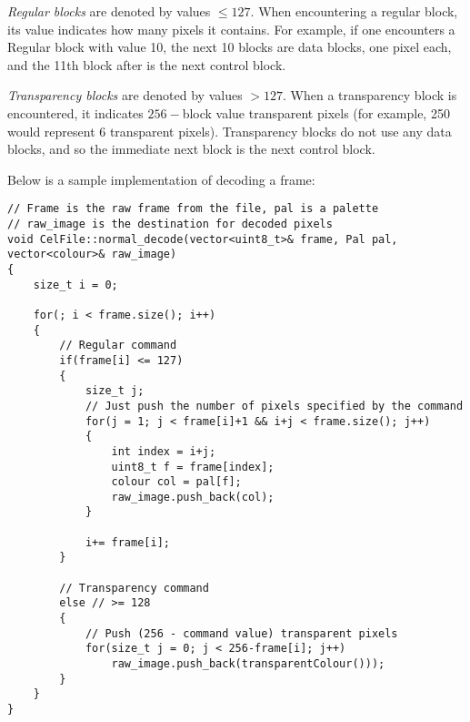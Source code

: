 	\emph{Regular blocks} are denoted by values $\leq 127$. When encountering a regular block, its value indicates how many pixels it contains. For example, if one encounters a Regular block with value 10, the next 10 blocks are data blocks, one pixel each, and the 11th block after is the next control block.
	
	\emph{Transparency blocks} are denoted by values $> 127$. When a transparency block is encountered, it indicates $256-$block value transparent pixels (for example, 250 would represent 6 transparent pixels). Transparency blocks do not use any data blocks, and so the immediate next block is the next control block.
	
	Below is a sample implementation of decoding a frame:
	
	\begin{lstlisting}
// Frame is the raw frame from the file, pal is a palette
// raw_image is the destination for decoded pixels
void CelFile::normal_decode(vector<uint8_t>& frame, Pal pal, vector<colour>& raw_image)
{
    size_t i = 0;
    
    for(; i < frame.size(); i++)
    {   
        // Regular command
        if(frame[i] <= 127)
        {    
            size_t j;
            // Just push the number of pixels specified by the command
            for(j = 1; j < frame[i]+1 && i+j < frame.size(); j++)
            {
                int index = i+j;
                uint8_t f = frame[index];
                colour col = pal[f];
                raw_image.push_back(col);
            }
    
            i+= frame[i];
        }

        // Transparency command
        else // >= 128
        {
            // Push (256 - command value) transparent pixels
            for(size_t j = 0; j < 256-frame[i]; j++)
                raw_image.push_back(transparentColour()));
        }
    }
}
	\end{lstlisting}

